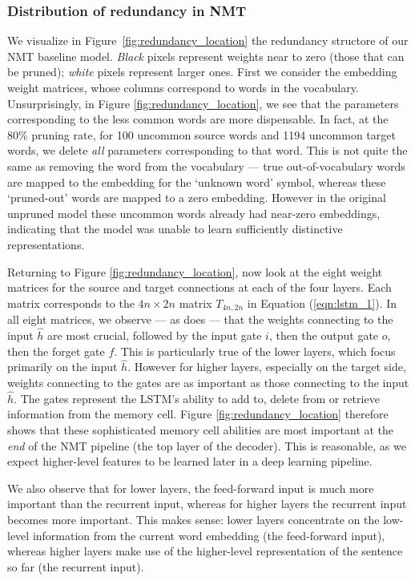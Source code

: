 \subsubsection{Distribution of redundancy in NMT}
\label{subsubsec:redundancy}

We visualize in Figure~\ref{fig:redundancy_location} the redundancy structore of
our NMT baseline model.
{\it Black} pixels represent weights near to zero (those that can be pruned); {\it white} pixels represent larger ones.
First we consider the embedding weight matrices, whose columns correspond to words in the vocabulary.
Unsurprisingly, in Figure \ref{fig:redundancy_location}, we see that the parameters corresponding to the less common words are more dispensable.
In fact, at the 80\% pruning rate, for 100 uncommon source words and 1194
uncommon target words, we delete \emph{all} parameters corresponding to that word.
This is not quite the same as removing the word from the vocabulary --- true out-of-vocabulary words are mapped to the embedding for the `unknown word' symbol, whereas these `pruned-out' words are mapped to a zero embedding.
However in the original unpruned model these uncommon words already had near-zero embeddings, indicating that the model was unable to learn sufficiently distinctive representations.

Returning to Figure \ref{fig:redundancy_location}, now look at the eight weight matrices for the source and target connections at each of the four layers.
Each matrix corresponds to the $4n \times 2n$ matrix $T_{4n,2n}$ in Equation (\ref{eqn:lstm_1}).
In all eight matrices, we observe --- as does \cite{lu2016learning} --- that the weights connecting to the input $\hat{h}$ are most crucial, followed by the input gate $i$, then the output gate $o$, then the forget gate $f$. 
This is particularly true of the lower layers, which focus primarily on the input $\hat{h}$. 
However for higher layers, especially on the target side, weights connecting to the gates are as important as those connecting to the input $\hat{h}$.
The gates represent the LSTM's ability to add to, delete from or retrieve information from the memory cell.
Figure \ref{fig:redundancy_location} therefore shows that these sophisticated memory cell abilities are most important at the \emph{end} of the NMT pipeline (the top layer of the decoder).
This is reasonable, as we expect higher-level features to be learned later in a deep learning pipeline.

We also observe that for lower layers, the feed-forward input is much more important than the recurrent input, whereas for higher layers the recurrent input becomes more important.
This makes sense: lower layers concentrate on the low-level information from the current word embedding (the feed-forward input), whereas higher layers make use of the higher-level representation of the sentence so far (the recurrent input).

